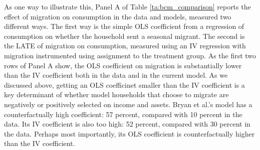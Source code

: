 \documentclass[12pt,pdftex]{article}
\begin{document}
As one way to illustrate this, Panel A of Table \ref{ta:bcm_comparison} reports the effect of migration on consumption in the data and models, measured two different ways. The first way is the simple OLS coefficient from a regression of consumption on whether the household sent a seasonal migrant. The second is the LATE of migration on consumption, measured using an IV regression with migration instrumented using assignment to the treatment group. As the first two rows of Panel A show, the OLS coefficient on migration is substantially lower than the IV coefficient both in the data and in the current model.  As we discussed above, getting an OLS coefficinet smaller than the IV coefficient is a key determinant of whether model households that choose to migrate are negatively or positively selected on income and assets. Bryan et al.'s model has a counterfactually high coefficient: 57 percent, compared with 10 percent in the data.
Its IV coefficient is also too high: 52 percent, compared with 30 percent in the data. Perhaps most importantly, its OLS coefficient is counterfactually higher than the IV coefficient.
\end{document}
